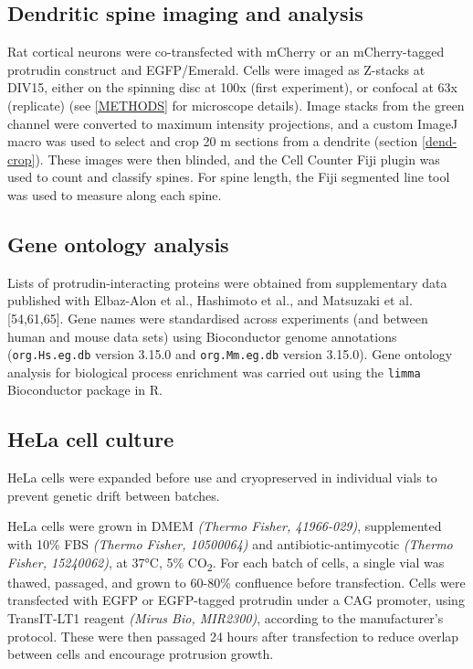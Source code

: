 \documentclass[
  12pt,
  a4paper,
]{book}
\begin{document}
\hypertarget{dendritic-spine-imaging-and-analysis}{%
\subsection{Dendritic spine imaging and analysis}\label{dendritic-spine-imaging-and-analysis}}

Rat cortical neurons were co-transfected with mCherry or an mCherry-tagged protrudin construct and EGFP/Emerald. Cells were imaged as Z-stacks at DIV15, either on the spinning disc at 100x (first experiment), or confocal at 63x (replicate) (see \ref{METHODS} for microscope details). Image stacks from the green channel were converted to maximum intensity projections, and a custom ImageJ macro was used to select and crop 20 \textmu{}m sections from a dendrite (section \ref{dend-crop}). These images were then blinded, and the Cell Counter Fiji plugin was used to count and classify spines. For spine length, the Fiji segmented line tool was used to measure along each spine.

\hypertarget{gene-ontology-analysis}{%
\subsection{Gene ontology analysis}\label{gene-ontology-analysis}}

Lists of protrudin-interacting proteins were obtained from supplementary data published with Elbaz-Alon et al., Hashimoto et al., and Matsuzaki et al. {[}54,61,65{]}. Gene names were standardised across experiments (and between human and mouse data sets) using Bioconductor genome annotations (\texttt{org.Hs.eg.db} version 3.15.0 and \texttt{org.Mm.eg.db} version 3.15.0). Gene ontology analysis for biological process enrichment was carried out using the \texttt{limma} Bioconductor package in R.

\hypertarget{hela-cell-culture}{%
\subsection{HeLa cell culture}\label{hela-cell-culture}}

HeLa cells were expanded before use and cryopreserved in individual vials to prevent genetic drift between batches.

HeLa cells were grown in DMEM \emph{(Thermo Fisher, 41966-029)}, supplemented with 10\% FBS \emph{(Thermo Fisher, 10500064)} and antibiotic-antimycotic \emph{(Thermo Fisher, 15240062)}, at 37°C, 5\% CO\textsubscript{2}. For each batch of cells, a single vial was thawed, passaged, and grown to 60-80\% confluence before transfection. Cells were transfected with EGFP or EGFP-tagged protrudin under a CAG promoter, using TransIT-LT1 reagent \emph{(Mirus Bio, MIR2300)}, according to the manufacturer's protocol. These were then passaged 24 hours after transfection to reduce overlap between cells and encourage protrusion growth.
\end{document}
